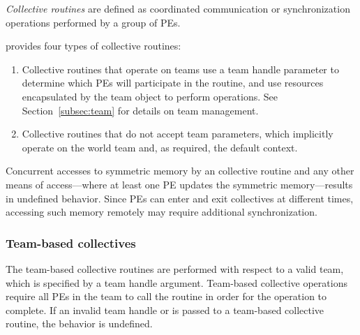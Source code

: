 \emph{Collective routines} are defined as coordinated communication or synchronization
operations performed by a group of \acp{PE}.

\openshmem provides four types of collective routines:

\begin{enumerate}
\item Collective routines that operate on teams use a team handle parameter to determine
  which \acp{PE} will participate in the routine, and use resources encapsulated by the team object
  to perform operations. See Section~\ref{subsec:team} for details on team management.


\item Collective routines that do not accept team
  parameters, which implicitly operate on the world team and, as
  required, the default context.
\end{enumerate}

Concurrent accesses to symmetric memory by an \openshmem collective
routine and any other means of access---where at least one \ac{PE} updates the
symmetric memory---results in undefined behavior.
Since \acp{PE} can enter and exit collectives at different times,
accessing such memory remotely may require additional synchronization.

\subsubsection*{Team-based collectives}
\label{subsec:team_collectives}

The team-based collective routines are performed with respect to a valid
\openshmem team, which is specified by a team handle argument.
Team-based collective operations require all \acp{PE} in the team to call
the routine in order for the operation to complete. If an invalid team handle
or  is passed to a team-based collective
routine, the behavior is undefined.


